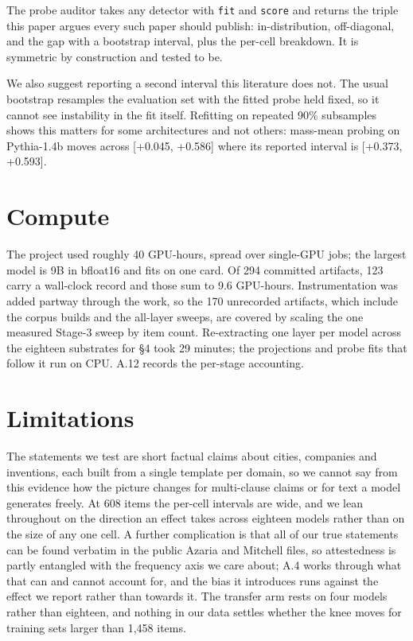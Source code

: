 \documentclass[10pt]{article}
\begin{document}
The probe auditor takes any detector with \texttt{fit} and \texttt{score} and returns the triple this paper argues every such paper should publish: in-distribution, off-diagonal, and the gap with a bootstrap interval, plus the per-cell breakdown. It is symmetric by construction and tested to be.

We also suggest reporting a second interval this literature does not. The usual bootstrap resamples the evaluation set with the fitted probe held fixed, so it cannot see instability in the fit itself. Refitting on repeated 90\% subsamples shows this matters for some architectures and not others: mass-mean probing on Pythia-1.4b moves across [+0.045, +0.586] where its reported interval is [+0.373, +0.593].

\section{Compute}

The project used roughly 40 GPU-hours, spread over single-GPU jobs; the largest model is 9B in bfloat16 and fits on one card. Of 294 committed artifacts, 123 carry a wall-clock record and those sum to 9.6 GPU-hours. Instrumentation was added partway through the work, so the 170 unrecorded artifacts, which include the corpus builds and the all-layer sweeps, are covered by scaling the one measured Stage-3 sweep by item count. Re-extracting one layer per model across the eighteen substrates for §4 took 29 minutes; the projections and probe fits that follow it run on CPU. A.12 records the per-stage accounting.

\section{Limitations}

The statements we test are short factual claims about cities, companies and inventions, each built from a single template per domain, so we cannot say from this evidence how the picture changes for multi-clause claims or for text a model generates freely. At 608 items the per-cell intervals are wide, and we lean throughout on the direction an effect takes across eighteen models rather than on the size of any one cell. A further complication is that all of our true statements can be found verbatim in the public Azaria and Mitchell files, so attestedness is partly entangled with the frequency axis we care about; A.4 works through what that can and cannot account for, and the bias it introduces runs against the effect we report rather than towards it. The transfer arm rests on four models rather than eighteen, and nothing in our data settles whether the knee moves for training sets larger than 1,458 items.
\end{document}
